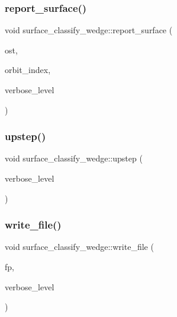 \subsubsection{\texorpdfstring{report\+\_\+surface()}{report\_surface()}}
{\footnotesize\ttfamily void surface\+\_\+classify\+\_\+wedge\+::report\+\_\+surface (\begin{DoxyParamCaption}\item[{ostream \&}]{ost,  }\item[{\mbox{\hyperlink{galois_8h_a09fddde158a3a20bd2dcadb609de11dc}{I\+NT}}}]{orbit\+\_\+index,  }\item[{\mbox{\hyperlink{galois_8h_a09fddde158a3a20bd2dcadb609de11dc}{I\+NT}}}]{verbose\+\_\+level }\end{DoxyParamCaption})}

\mbox{\label{classsurface__classify__wedge_a917a77e18ede81788ba0550d3f55f639}} 
\subsubsection{\texorpdfstring{upstep()}{upstep()}}
{\footnotesize\ttfamily void surface\+\_\+classify\+\_\+wedge\+::upstep (\begin{DoxyParamCaption}\item[{\mbox{\hyperlink{galois_8h_a09fddde158a3a20bd2dcadb609de11dc}{I\+NT}}}]{verbose\+\_\+level }\end{DoxyParamCaption})}

\mbox{\label{classsurface__classify__wedge_ad159c83c84f17e92c52fafeea5e57ce4}} 
\subsubsection{\texorpdfstring{write\+\_\+file()}{write\_file()}}
{\footnotesize\ttfamily void surface\+\_\+classify\+\_\+wedge\+::write\+\_\+file (\begin{DoxyParamCaption}\item[{ofstream \&}]{fp,  }\item[{\mbox{\hyperlink{galois_8h_a09fddde158a3a20bd2dcadb609de11dc}{I\+NT}}}]{verbose\+\_\+level }\end{DoxyParamCaption})}



